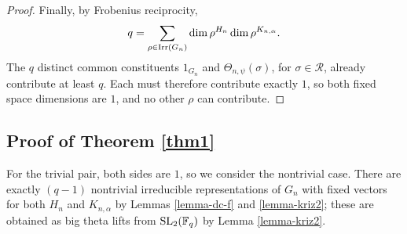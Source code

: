 \documentclass[12pt]{amsart}
\theoremstyle{definition}
\theoremstyle{remark}
\begin{document}
\begin{proof}
Finally, by Frobenius reciprocity, 
\[
q
=
\sum_{\rho \in {\rm Irr}(G_n)}
\dim\rho^{H_n}
\dim\rho^{K_{n,\alpha}}.
\]
The $q$ distinct common constituents $1_{G_n}$ and $\Theta_{n,\psi}(\sigma)$, for $\sigma\in\mathcal R$, 
already contribute at least $q$.
Each must therefore contribute exactly $1$, so both fixed space
dimensions are $1$, and no other $\rho$ can contribute.
\end{proof}

\subsection{Proof of Theorem \ref{thm1}}\label{proofthm1}

For the trivial pair, both sides are $1$, so we consider the nontrivial case. There are exactly $(q-1)$ nontrivial irreducible representations of $G_n$ with fixed vectors for both $H_n$ and $K_{n,\alpha}$ by Lemmas \ref{lemma-dc-f} and \ref{lemma-kriz2}; these are obtained as big theta lifts from ${\rm SL}_2(\mathbb F_q)$ by Lemma \ref{lemma-kriz2}.
\end{document}
